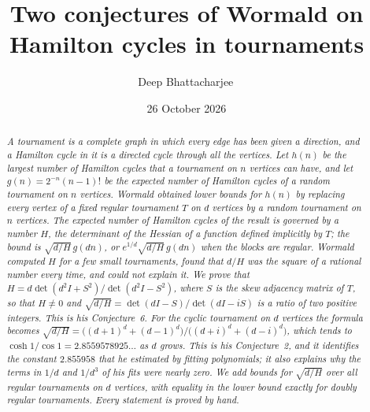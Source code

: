 \documentclass[11pt,a4paper,reqno]{amsart}
\title[Two conjectures of Wormald on Hamilton cycles]{Two conjectures of Wormald on Hamilton cycles in tournaments}
\author{Deep Bhattacharjee\,\orcidlink{0000-0003-0466-750X}}
\date{26 October 2026}
\theoremstyle{remark}
\numberwithin{equation}{section}
\begin{document}
\begin{abstract}
\itshape
A tournament is a complete graph in which every edge has been given a direction, and a Hamilton cycle in it is a directed cycle through all the vertices. Let $h(n)$ be the largest number of Hamilton cycles that a tournament on $n$ vertices can have, and let $g(n)=2^{-n}(n-1)!$ be the expected number of Hamilton cycles of a random tournament on $n$ vertices. Wormald obtained lower bounds for $h(n)$ by replacing every vertex of a fixed regular tournament $T$ on $d$ vertices by a random tournament on $n$ vertices. The expected number of Hamilton cycles of the result is governed by a number $H$, the determinant of the Hessian of a function defined implicitly by $T$; the bound is $\sqrt{d/H}\,g(dn)$, or $e^{1/d}\sqrt{d/H}\,g(dn)$ when the blocks are regular. Wormald computed $H$ for a few small tournaments, found that $d/H$ was the square of a rational number every time, and could not explain it. We prove that $H=d\det(d^2I+S^2)/\det(d^2I-S^2)$, where $S$ is the skew adjacency matrix of $T$, so that $H\neq0$ and $\sqrt{d/H}=\det(dI-S)/\det(dI-iS)$ is a ratio of two positive integers. This is his Conjecture~6. For the cyclic tournament on $d$ vertices the formula becomes $\sqrt{d/H}=\bigl((d+1)^d+(d-1)^d\bigr)/\bigl((d+i)^d+(d-i)^d\bigr)$, which tends to $\cosh1/\cos1=2.8559578925\ldots$ as $d$ grows. This is his Conjecture~2, and it identifies the constant $2.855958$ that he estimated by fitting polynomials; it also explains why the terms in $1/d$ and $1/d^3$ of his fits were nearly zero. We add bounds for $\sqrt{d/H}$ over all regular tournaments on $d$ vertices, with equality in the lower bound exactly for doubly regular tournaments. Every statement is proved by hand.
\end{abstract}

\maketitle
\end{document}
